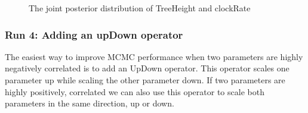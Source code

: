 \documentclass[11pt]{article}
\begin{document}
\begin{figure}[!h]
\centering
{}
\caption{\small The joint posterior distribution of TreeHeight and clockRate}
\label{fig:tracer_run3Joint}
\end{figure}

\bigskip
\subsubsection{Run 4: Adding an upDown operator}

The easiest way to improve MCMC performance when two parameters are highly negatively correlated is to add an UpDown operator. This operator scales one parameter up while scaling the other parameter down. If two parameters are highly positively, correlated we can also use this operator to scale both parameters in the same direction, up or down. 
\end{document}
